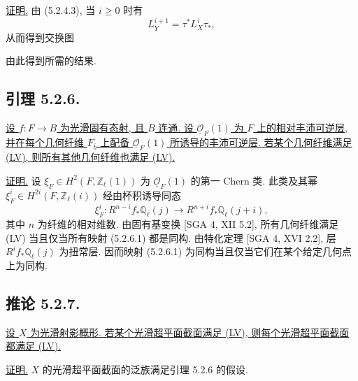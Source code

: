 \underline{证明.}
由 (5.2.4.3), 当 $i\geq0$ 时有
\[
L_Y^{i+1}=\tau^*L_X^i\tau_*,
\]
从而得到交换图
\begin{center}
\end{center}
由此得到所需的结果.

\subsection*{引理 5.2.6.}
\underline{设 $f:F\to B$ 为光滑固有态射, 且 $B$ 连通. 设 $\underline{\mathcal O}_F(1)$ 为 $F$ 上的相对丰沛可逆层, 并在每个几何纤维 $F_{\bar b}$ 上配备 $\underline{\mathcal O}_F(1)$ 所诱导的丰沛可逆层. 若某个几何纤维满足 (LV), 则所有其他几何纤维也满足 (LV).}

\underline{证明.}
设 $\xi_F\in H^2(F,\mathbb Z_\ell(1))$ 为 $\underline{\mathcal O}_F(1)$ 的第一 Chern 类. 此类及其幂 $\xi_F^i\in H^{2i}(F,\mathbb Z_\ell(i))$ 经由杯积诱导同态
\begin{equation}\tag{5.2.6.1}
\xi_F^i:R^{n-i}f_*\mathbb Q_\ell(j)
\longrightarrow R^{n+i}f_*\mathbb Q_\ell(j+i),
\end{equation}
其中 $n$ 为纤维的相对维数. 由固有基变换 [SGA 4, XII 5.2], 所有几何纤维满足 (LV) 当且仅当所有映射 (5.2.6.1) 都是同构. 由特化定理 [SGA 4, XVI 2.2], 层 $R^if_*\mathbb Q_\ell(j)$ 为扭常层. 因而映射 (5.2.6.1) 为同构当且仅当它们在某个给定几何点上为同构.

\subsection*{推论 5.2.7.}
\underline{设 $X$ 为光滑射影概形. 若某个光滑超平面截面满足 (LV), 则每个光滑超平面截面都满足 (LV).}

\underline{证明.}
$X$ 的光滑超平面截面的泛族满足引理 5.2.6 的假设.
